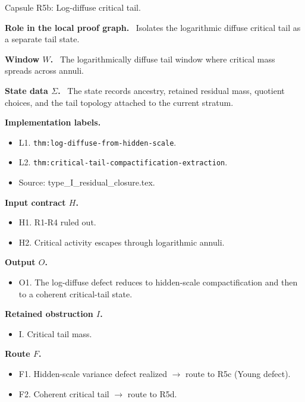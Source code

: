 \documentclass[11pt]{amsart}
\newcommand{\capsulefield}[1]{\par\smallskip\noindent\textbf{#1.}\ }
\begin{document}
\begin{proofcapsule}{Capsule R5b: Log-diffuse critical tail.}
  \capsulefield{Role in the local proof graph}
  Isolates the logarithmic diffuse critical tail as a separate tail state.

  \capsulefield{Window \(W\)}
The logarithmically diffuse tail window where critical mass spreads across annuli.

  \capsulefield{State data \(\Sigma\)}
The state records ancestry, retained residual mass, quotient choices, and the tail topology attached to the current stratum.

  \capsulefield{Implementation labels}
  \begin{itemize}[leftmargin=1.8em]
  \item L1. \texttt{thm:log-diffuse-from-hidden-scale}.
  \item L2. \texttt{thm:critical-tail-compactification-extraction}.
  \item Source: type\_I\_residual\_closure.tex.
  \end{itemize}

  \capsulefield{Input contract \(H\)}
  \begin{itemize}[leftmargin=1.8em]
  \item H1. R1-R4 ruled out.
  \item H2. Critical activity escapes through logarithmic annuli.
  \end{itemize}

  \capsulefield{Output \(O\)}
  \begin{itemize}[leftmargin=1.8em]
  \item O1. The log-diffuse defect reduces to hidden-scale compactification and then to a coherent critical-tail state.
  \end{itemize}

  \capsulefield{Retained obstruction \(I\)}
  \begin{itemize}[leftmargin=1.8em]
  \item I. Critical tail mass.
  \end{itemize}

  \capsulefield{Route \(F\)}
  \begin{itemize}[leftmargin=1.8em]
  \item F1. Hidden-scale variance defect realized $\to$ route to R5c (Young defect).
  \item F2. Coherent critical tail $\to$ route to R5d.
  \end{itemize}


\end{proofcapsule}
\end{document}
